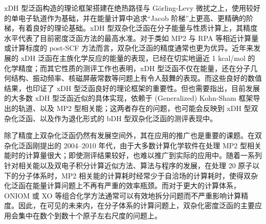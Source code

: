 xDH 型泛函构造的理论框架搭建在绝热路径与 G\"{o}rling-Levy 微扰之上，使用较好的单电子轨道作为基础，并在能量计算中追求“Jacob 阶梯”上更高、更精确的阶梯，有着良好的理论基础。xDH 型双杂化泛函在分子能量与性质计算上，其精度水平代表了目前密度泛函方法的最高水准。对于类如 MP2 与 RPA 等相近计算量或计算标度的 post-SCF 方法而言，双杂化泛函的精度通常也更为优异。近年来发展的 xDH 泛函在主族化学反应的能量的表现，已经在切实地逼近 1 kcal/mol 的化学精度；而其它性质的测评工作也表明，xDH 型泛函不仅在能量，还在分子几何结构、振动频率、核磁屏蔽常数等问题上有令人鼓舞的表现。而这些良好的数值结果，也印证了 xDH 型泛函良好的理论框架的重要性。但也需要指出，目前发展的大多数 xDH 型泛函近似的具体实现，依赖于 (Generalized) Kohn-Sham 框架导出的轨道、以及 MP2 型相关能；这两者存在的问题，也可能会反映到 xDH 型双杂化泛函、以及作为退化形式的 bDH 型双杂化泛函的测评表现中。

除了精度上双杂化泛函仍然有发展空间外，其在应用的推广也是重要的课题。在双杂化泛函刚提出的 2004--2010 年代，由于大多数计算化学软件在处理 MP2 型相关能时的计算量很大；即使测评结果较好，也难以推广到实际的应用中。随着一系列针对相关能以及双电子积分计算近似方法、算法与程序的发展，在处理 20 原子以下的分子体系时，MP2 相关能的计算耗时经常少于自洽场的计算耗时，使得双杂化泛函在能量计算问题上不再有严重的效率瓶颈。而对于更大的计算体系，ONIOM 或 XO 等组合化学方法通常可以有效地拆分问题而不严重影响计算精度\cite{Guo-Xu.JCC.2012, Chen-Xu.JCTC.2020, Chen-Xu.NC.2023}。因此，在可见的未来内，在分子体系的计算问题上，双杂化密度泛函的主要应用会集中在数个到数十个原子左右尺度的问题上。

